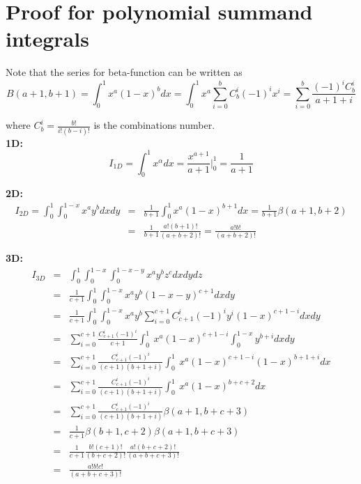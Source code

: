 \section{Proof for polynomial summand integrals}
\label{appendix-proof-simplexintegral}


\noindent
Note that the series for beta-function can be written as
\[B(a+1,b+1) = \int_0^1 x^a (1-x)^b dx = \int_0^1 x^a \sum_{i=0}^b C_b^i (-1)^i x^i = \sum_{i=0}^b \frac{(-1)^i C_b^i}{a+1+i}\]

\noindent
where $C_b^i = \frac{b!}{i!(b-i)!}$ is the combinations number. \\

\noindent
\textbf{1D:} \\

\begin{equation}
	I_{1D} = \int_0^1 x^{\alpha} dx = \frac{x^{a + 1}}{a + 1} \biggr |_0^1 = \frac{1}{a + 1}
\end{equation}

\noindent
\textbf{2D:} \\

\begin{eqnarray*}
	I_{2D} = \int_0^1 \int_0^{1-x} x^{a} y^{b} dx dy
	& = & \frac{1}{b+1} \int_0^1 x^{a} (1-x)^{b+1} dx = \frac{1}{b+1} \beta(a + 1, b + 2) \\
	& = & \frac{1}{b+1} \frac{a!(b+1)!}{(a+b+2)!} = \frac{a!b!}{(a+b+2)!}
\end{eqnarray*}

\noindent
\textbf{3D:} \\

\begin{eqnarray*}
	I_{3D}
	& = & \int_0^1 \int_0^{1-x} \int_0^{1-x-y} x^a y^b z^c dx dy dz \\
	& = & \frac{1}{c+1} \int_0^1 \int_0^{1-x} x^a y^b (1-x-y)^{c+1} dx dy \\
	& = & \frac{1}{c+1} \int_0^1 \int_0^{1-x} x^a y^b \sum_{i=0}^{c+1} C_{c+1}^i (-1)^i y^i (1-x)^{c+1-i} dx dy \\
	& = & \sum_{i=0}^{c+1} \frac{C_{c+1}^i (-1)^i}{c+1} \int_0^1 \ x^a (1-x)^{c+1-i} \int_0^{1-x} y^{b+i} dx dy \\
	& = & \sum_{i=0}^{c+1} \frac{C_{c+1}^i (-1)^i}{(c+1)(b+1+i)} \int_0^1 \ x^a (1-x)^{c+1-i} (1-x)^{b+1+i} dx \\
	& = & \sum_{i=0}^{c+1} \frac{C_{c+1}^i (-1)^i}{(c+1)(b+1+i)} \int_0^1 \ x^a (1-x)^{b+c+2} dx \\
	& = & \sum_{i=0}^{c+1} \frac{C_{c+1}^i (-1)^i}{(c+1)(b+1+i)} \beta(a+1, b+c+3) \\
	& = & \frac{1}{c+1} \beta(b+1,c+2) \beta(a+1, b+c+3) \\
	& = & \frac{1}{c+1} \frac{b!(c+1)!}{(b+c+2)!} \frac{a! (b+c+2)!}{(a+b+c+3)!} \\
	& = &  \frac{a! b! c!}{(a+b+c+3)!}
\end{eqnarray*}
